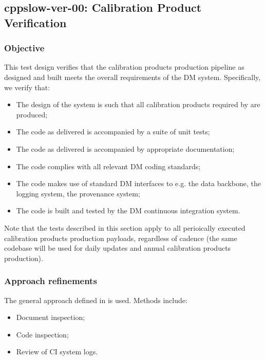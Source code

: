 \subsection{cppslow-ver-00: Calibration Product Verification}
\label{cppslow-ver-00}

\subsubsection{Objective}

This test design verifies that the calibration products production pipeline as
designed and built meets the overall requirements of the DM system.
Specifically, we verify that:

\begin{itemize}

  \item{The design of the system is such that all calibration products
  required by  are produced;}

  \item{The code as delivered is accompanied by a suite of unit tests;}

  \item{The code as delivered is accompanied by appropriate documentation;}

  \item{The code complies with all relevant DM coding standards;}

  \item{The code makes use of standard DM interfaces to e.g. the data
  backbone, the logging system, the provenance system;}

  \item{The code is built and tested by the DM continuous integration system.}

\end{itemize}

Note that the tests described in this section apply to all perioically
executed calibration products production payloads, regardless of cadence (the
same codebase will be used for daily updates and annual calibration products
production).

\subsubsection{Approach refinements}

The general approach defined in  is used. Methods include:

\begin{itemize}

  \item{Document inspection;}
  \item{Code inspection;}
  \item{Review of CI system logs.}

\end{itemize}

